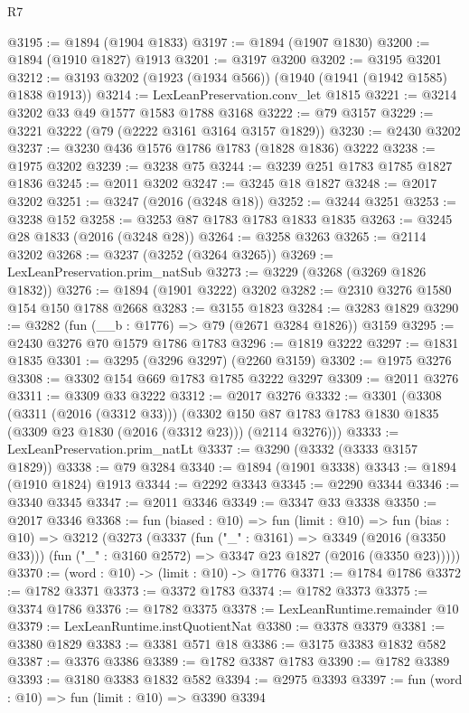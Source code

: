 \begin{lexlean}{R7}
\begin{coremodule}
@3195 := @1894 (@1904 @1833)
@3197 := @1894 (@1907 @1830)
@3200 := @1894 (@1910 @1827) @1913
@3201 := @3197 @3200
@3202 := @3195 @3201
@3212 := @3193 @3202 (@1923 (@1934 @566)) (@1940 (@1941 (@1942 @1585) @1838 @1913))
@3214 := LexLeanPreservation.conv_let @1815
@3221 := @3214 @3202 @33 @49 @1577 @1583 @1788 @3168
@3222 := @79 @3157
@3229 := @3221 @3222 (@79 (@2222 @3161 @3164 @3157 @1829))
@3230 := @2430 @3202
@3237 := @3230 @436 @1576 @1786 @1783 (@1828 @1836) @3222
@3238 := @1975 @3202
@3239 := @3238 @75
@3244 := @3239 @251 @1783 @1785 @1827 @1836
@3245 := @2011 @3202
@3247 := @3245 @18 @1827
@3248 := @2017 @3202
@3251 := @3247 (@2016 (@3248 @18))
@3252 := @3244 @3251
@3253 := @3238 @152
@3258 := @3253 @87 @1783 @1783 @1833 @1835
@3263 := @3245 @28 @1833 (@2016 (@3248 @28))
@3264 := @3258 @3263
@3265 := @2114 @3202
@3268 := @3237 (@3252 (@3264 @3265))
@3269 := LexLeanPreservation.prim_natSub
@3273 := @3229 (@3268 (@3269 @1826 @1832))
@3276 := @1894 (@1901 @3222) @3202
@3282 := @2310 @3276 @1580 @154 @150 @1788 @2668
@3283 := @3155 @1823
@3284 := @3283 @1829
@3290 := @3282 (fun (__b : @1776) => @79 (@2671 @3284 @1826)) @3159
@3295 := @2430 @3276 @70 @1579 @1786 @1783
@3296 := @1819 @3222
@3297 := @1831 @1835
@3301 := @3295 (@3296 @3297) (@2260 @3159)
@3302 := @1975 @3276
@3308 := @3302 @154 @669 @1783 @1785 @3222 @3297
@3309 := @2011 @3276
@3311 := @3309 @33 @3222
@3312 := @2017 @3276
@3332 := @3301
    (@3308
      (@3311 (@2016 (@3312 @33)))
      (@3302 @150 @87 @1783 @1783 @1830 @1835 (@3309 @23 @1830 (@2016 (@3312 @23))) (@2114 @3276)))
@3333 := LexLeanPreservation.prim_natLt
@3337 := @3290 (@3332 (@3333 @3157 @1829))
@3338 := @79 @3284
@3340 := @1894 (@1901 @3338)
@3343 := @1894 (@1910 @1824) @1913
@3344 := @2292 @3343
@3345 := @2290 @3344
@3346 := @3340 @3345
@3347 := @2011 @3346
@3349 := @3347 @33 @3338
@3350 := @2017 @3346
@3368 := fun (biased : @10) =>
  fun (limit : @10) =>
  fun (bias : @10) =>
  @3212
    (@3273
      (@3337
        (fun ("_" : @3161) => @3349 (@2016 (@3350 @33)))
        (fun ("_" : @3160 @2572) => @3347 @23 @1827 (@2016 (@3350 @23)))))
@3370 := (word : @10) -> (limit : @10) -> @1776
@3371 := @1784 @1786
@3372 := @1782 @3371
@3373 := @3372 @1783
@3374 := @1782 @3373
@3375 := @3374 @1786
@3376 := @1782 @3375
@3378 := LexLeanRuntime.remainder @10
@3379 := LexLeanRuntime.instQuotientNat
@3380 := @3378 @3379
@3381 := @3380 @1829
@3383 := @3381 @571 @18
@3386 := @3175 @3383 @1832 @582
@3387 := @3376 @3386
@3389 := @1782 @3387 @1783
@3390 := @1782 @3389
@3393 := @3180 @3383 @1832 @582
@3394 := @2975 @3393
@3397 := fun (word : @10) => fun (limit : @10) => @3390 @3394

\end{coremodule}
\end{lexlean}
